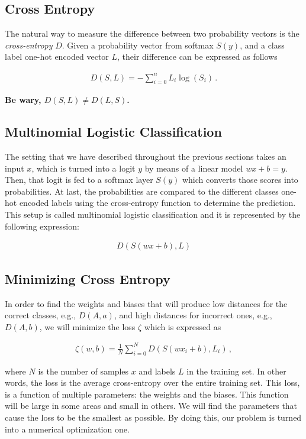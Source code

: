 \documentclass[english, 11pt]{article}
\begin{document}
	\subsection{Cross Entropy}

	The natural way to measure the difference between two probability vectors is the \emph{cross-entropy} $D$. Given a probability vector from softmax $S(y)$, and a class label one-hot encoded vector $L$, their difference can be expressed as follows

	\begin{align*}
		D(S, L) = -\displaystyle\sum_{i=0}^{n}L_i \log(S_i)\,.
	\end{align*}

	\textbf{Be wary, $D(S, L) \neq D(L, S)$.}

	\subsection{Multinomial Logistic Classification}

	The setting that we have described throughout the previous sections takes an input $x$, which is turned into a logit $y$ by means of a linear model $wx + b = y$. Then, that logit is fed to a softmax layer $S(y)$ which converts those scores into probabilities. At last, the probabilities are compared to the different classes one-hot encoded labels using the cross-entropy function to determine the prediction. This setup is called multinomial logistic classification and it is represented by the following expression:

	\begin{align*}
		D(S(wx + b), L)
	\end{align*}

	\subsection{Minimizing Cross Entropy}

	In order to find the weights and biases that will produce low distances for the correct classes, e.g., $D(A,a)$, and high distances for incorrect ones, e.g., $D(A,b)$, we will minimize the loss $\zeta$ which is expressed as

	\begin{align*}
		\zeta(w, b) = \displaystyle\frac{1}{N}\displaystyle\sum_{i=0}^N D(S(wx_i+b),L_i)\,,
	\end{align*}

	where $N$ is the number of samples $x$ and labels $L$ in the training set. In other words, the loss is the average cross-entropy over the entire training set. This loss, is a function of multiple parameters: the weights and the biases. This function will be large in some areas and small in others. We will find the parameters that cause the loss to be the smallest as possible. By doing this, our problem is turned into a numerical optimization one.
\end{document}

